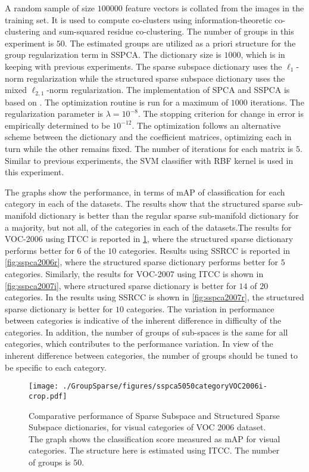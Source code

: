 A random sample of size $100000$ feature vectors is collated from the images in the training set. It is used to compute co-clusters using information-theoretic co-clustering and sum-squared residue co-clustering. The number of groups in this experiment is $50$. The estimated groups are utilized as a priori structure for the group regularization term in SSPCA. The dictionary size is $1000$, which is in keeping with previous experiments. The sparse subspace dictionary uses the $\ell_{1}$-norm regularization while the structured sparse subspace dictionary uses the mixed $\ell_{2,1}$-norm regularization. The implementation of SPCA and SSPCA is based on \citep{Jenatton2009}. The optimization routine is run for a maximum of $1000$ iterations. The regularization parameter is $\lambda = 10^{-8}$. The stopping criterion for change in error is empirically determined to be $10^{-12}$. The optimization follows an alternative scheme between the dictionary and the coefficient matrices, optimizing each in turn while the other remains fixed. The number of iterations for each matrix is $5$. Similar to previous experiments, the SVM classifier with RBF kernel is used in this experiment. 

The graphs show the performance, in terms of mAP of classification for each category in each of the datasets. The results show that the structured sparse sub-manifold dictionary is better than the regular sparse sub-manifold dictionary for a majority, but not all, of the categories in each of the datasets.The results for VOC-2006 using ITCC is reported in \cref{fig:sspca2006i}, where the structured sparse dictionary performs better for $6$ of the $10$ categories. Results using SSRCC is reported in \cref{fig:sspca2006r}, where the structured sparse dictionary performs better for $5$ categories. Similarly, the results for VOC-2007 using ITCC is shown in \cref{fig:sspca2007i}, where structured sparse dictionary is better for $14$ of $20$ categories. In the results using SSRCC is shown in \cref{fig:sspca2007r}, the structured sparse dictionary is better for $10$ categories.  The variation in performance between categories is indicative of the inherent difference in difficulty of the categories. In addition, the number of groups of sub-spaces is the same for all categories, which contributes to the performance variation. In view of the inherent difference between categories, the number of groups should be tuned to be specific to each category.

\begin{figure}
 \centering
 \texttt{[image: ./GroupSparse/figures/sspca5050categoryVOC2006i-crop.pdf]}
 \caption[Comparison of Sparse Subspace and ITCC Structured Sparse Subspace dictionaries using VOC-2006 dataset]{Comparative performance of Sparse Subspace and Structured Sparse Subspace dictionaries, for visual categories of VOC 2006 dataset. The graph shows the classification score measured as mAP for visual categories. The structure here is estimated using ITCC. The number of groups is $50$.}
 \label{fig:sspca2006i}
\end{figure}

